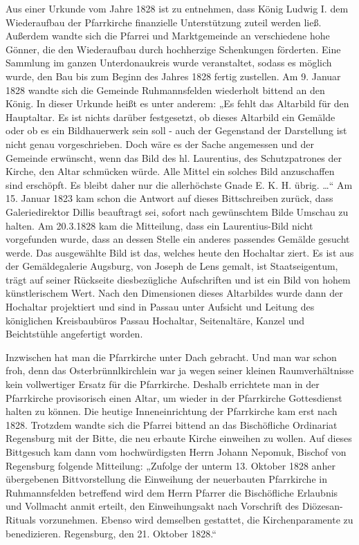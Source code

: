 \documentclass[12pt,a4paper]{book}
\begin{document}
Aus einer Urkunde vom Jahre 1828 ist zu entnehmen, dass König Ludwig I. dem
Wiederaufbau der Pfarrkirche finanzielle Unterstützung zuteil werden ließ.
Außerdem wandte sich die Pfarrei und Marktgemeinde an verschiedene hohe Gönner,
die den Wiederaufbau durch hochherzige Schenkungen förderten. Eine Sammlung im
ganzen Unterdonaukreis wurde veranstaltet, sodass es möglich wurde, den Bau bis
zum Beginn des Jahres 1828 fertig zustellen. Am 9. Januar 1828 wandte sich die
Gemeinde Ruhmannsfelden wiederholt bittend an den König. In dieser Urkunde heißt
es unter anderem: „Es fehlt das Altarbild für den Hauptaltar. Es ist nichts
darüber festgesetzt, ob dieses Altarbild ein Gemälde oder ob es ein
Bildhauerwerk sein soll - auch der Gegenstand der Darstellung ist nicht genau
vorgeschrieben. Doch wäre es der Sache angemessen und der Gemeinde erwünscht,
wenn das Bild des hl. Laurentius, des Schutzpatrones der Kirche, den Altar
schmücken würde. Alle Mittel ein solches Bild anzuschaffen sind erschöpft. Es
bleibt daher nur die allerhöchste Gnade E. K. H. übrig. …“ Am 15. Januar 1823
kam schon die Antwort auf dieses Bittschreiben zurück, dass Galeriedirektor
Dillis beauftragt sei, sofort nach gewünschtem Bilde Umschau zu halten. Am
20.3.1828 kam die Mitteilung, dass ein Laurentius-Bild nicht vorgefunden wurde,
dass an dessen Stelle ein anderes passendes Gemälde gesucht werde. Das
ausgewählte Bild ist das, welches heute den Hochaltar ziert. Es ist aus der
Gemäldegalerie Augsburg, von Joseph de Lens gemalt, ist Staatseigentum, trägt
auf seiner Rückseite diesbezügliche Aufschriften und ist ein Bild von hohem
künstlerischem Wert. Nach den Dimensionen dieses Altarbildes wurde dann der
Hochaltar projektiert und sind in Passau unter Aufsicht und Leitung des
königlichen Kreisbaubüros Passau Hochaltar, Seitenaltäre, Kanzel und
Beichtstühle angefertigt worden.

Inzwischen hat man die Pfarrkirche unter Dach gebracht. Und man war schon froh,
denn das Osterbrünnlkirchlein war ja wegen seiner kleinen Raumverhältnisse kein
vollwertiger Ersatz für die Pfarrkirche. Deshalb errichtete man in der
Pfarrkirche provisorisch einen Altar, um wieder in der Pfarrkirche Gottesdienst
halten zu können. Die heutige Inneneinrichtung der Pfarrkirche kam erst nach
1828. Trotzdem wandte sich die Pfarrei bittend an das Bischöfliche Ordinariat
Regensburg mit der Bitte, die neu erbaute Kirche einweihen zu wollen. Auf dieses
Bittgesuch kam dann vom hochwürdigsten Herrn Johann Nepomuk, Bischof von
Regensburg folgende Mitteilung: „Zufolge der unterm 13. Oktober 1828 anher
übergebenen Bittvorstellung die Einweihung der neuerbauten Pfarrkirche in
Ruhmannsfelden betreffend wird dem Herrn Pfarrer die Bischöfliche Erlaubnis und
Vollmacht anmit erteilt, den Einweihungsakt nach Vorschrift des Diözesan-Rituals
vorzunehmen. Ebenso wird demselben gestattet, die Kirchenparamente zu
benedizieren. Regensburg, den 21. Oktober 1828.“
\end{document}
